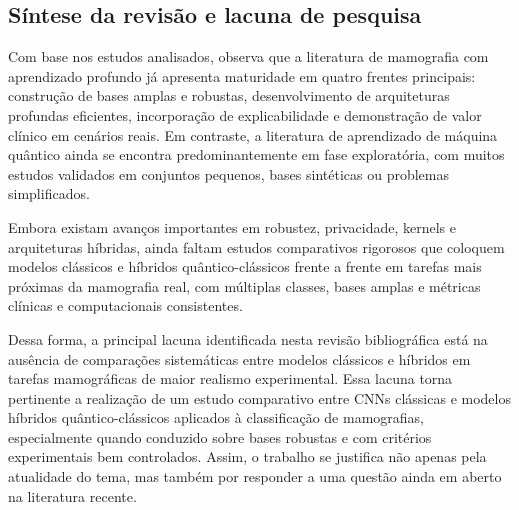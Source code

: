 \subsection{Síntese da revisão e lacuna de pesquisa}

Com base nos estudos analisados, observa que a literatura de mamografia com aprendizado profundo já apresenta maturidade em quatro frentes principais: construção de bases amplas e robustas, desenvolvimento de arquiteturas profundas eficientes, incorporação de explicabilidade e demonstração de valor clínico em cenários reais. Em contraste, a literatura de aprendizado de máquina quântico ainda se encontra predominantemente em fase exploratória, com muitos estudos validados em conjuntos pequenos, bases sintéticas ou problemas simplificados.

Embora existam avanços importantes em robustez, privacidade, kernels e arquiteturas híbridas, ainda faltam estudos comparativos rigorosos que coloquem modelos clássicos e híbridos quântico-clássicos frente a frente em tarefas mais próximas da mamografia real, com múltiplas classes, bases amplas e métricas clínicas e computacionais consistentes.

Dessa forma, a principal lacuna identificada nesta revisão bibliográfica está na ausência de comparações sistemáticas entre modelos clássicos e híbridos em tarefas mamográficas de maior realismo experimental. Essa lacuna torna pertinente a realização de um estudo comparativo entre CNNs clássicas e modelos híbridos quântico-clássicos aplicados à classificação de mamografias, especialmente quando conduzido sobre bases robustas e com critérios experimentais bem controlados. Assim, o trabalho se justifica não apenas pela atualidade do tema, mas também por responder a uma questão ainda em aberto na literatura recente.